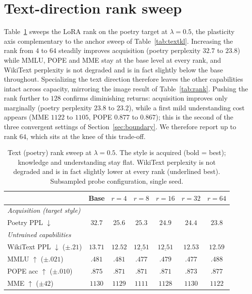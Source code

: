 \documentclass{article}
\begin{document}
\section{Text-direction rank sweep}
\label{app:textsweep}
Table~\ref{tab:textrank} sweeps the LoRA rank on the poetry target at
$\lambda{=}0.5$, the plasticity axis complementary to the anchor sweep of
Table~\ref{tab:textkl}. Increasing the rank from $4$ to $64$ steadily improves
acquisition (poetry perplexity $32.7$ to $23.8$) while MMLU, POPE and MME stay at
the base level at every rank, and WikiText perplexity is not degraded and is in
fact slightly below the base throughout. Specializing the text direction
therefore leaves the other capabilities intact across capacity, mirroring the
image result of Table~\ref{tab:rank}. Pushing the rank further to $128$ confirms
diminishing returns: acquisition improves only marginally (poetry perplexity
$23.8$ to $23.2$), while a first mild understanding cost appears (MME $1122$ to
$1105$, POPE $0.877$ to $0.867$); this is the second of the three convergent
settings of Section~\ref{sec:boundary}. We therefore report up to rank $64$,
which sits at the knee of this trade-off.

\begin{table}[t]
\centering\small
\setlength{\tabcolsep}{7pt}
\begin{tabular}{lcccccc}
\toprule
& Base & $r{=}4$ & $r{=}8$ & $r{=}16$ & $r{=}32$ & $r{=}64$ \\
\midrule
\multicolumn{7}{l}{\textit{Acquisition (target style)}}\\
Poetry PPL $\downarrow$ & $32.7$ & $25.6$ & $25.3$ & $24.9$ & $24.4$ & $\mathbf{23.8}$ \\
\midrule
\multicolumn{7}{l}{\textit{Untrained capabilities}}\\
WikiText PPL $\downarrow$ \tiny($\pm.21$) & $13.71$ & $12.52$ & $\underline{12.51}$ & $\underline{12.51}$ & $12.53$ & $12.59$ \\
MMLU $\uparrow$ \tiny($\pm.021$)          & $.481$ & $.481$ & $.477$ & $.479$ & $.477$ & $.488$ \\
POPE acc $\uparrow$ \tiny($\pm.010$)      & $.875$ & $.871$ & $.871$ & $.871$ & $.873$ & $.877$ \\
MME $\uparrow$ \tiny($\pm42$)             & $1130$ & $1129$ & $1111$ & $1128$ & $1130$ & $1122$ \\
\bottomrule
\end{tabular}
\caption{Text (poetry) rank sweep at $\lambda{=}0.5$. The style is acquired (bold
= best); knowledge and understanding stay flat. WikiText perplexity is not
degraded and is in fact slightly lower at every rank (underlined best).
Subsampled probe configuration, single seed.}
\label{tab:textrank}
\end{table}
\end{document}
